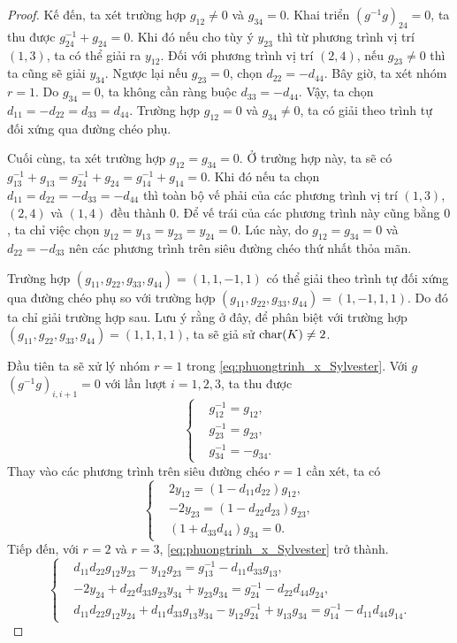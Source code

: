 \begin{proof}
    Kế đến, ta xét trường hợp \( g_{12} \neq 0 \) và \( g_{34} = 0 \). Khai triển \( (g^{-1} g)_{24} = 0 \), ta thu được \( g^{-1}_{24} + g_{24} = 0 \). Khi đó nếu cho tùy ý \( y_{23} \) thì từ phương trình vị trí $(1,3)$, ta có thể giải ra $y_{12}$. Đối với phương trình vị trí $(2,4)$, nếu $g_{23} \neq 0$ thì ta cũng sẽ giải $y_{34}$. Ngược lại nếu $g_{23} = 0$, chọn \( d_{22} = -d_{44} \). Bây giờ, ta xét nhóm \( r = 1 \). Do $g_{34} = 0$, ta không cần ràng buộc \( d_{33} = -d_{44} \). Vậy, ta chọn \( d_{11} = -d_{22} = d_{33} = d_{44} \). Trường hợp \( g_{12} = 0 \) và \( g_{34} \neq 0 \), ta có giải theo trình tự đối xứng qua đường chéo phụ.

    Cuối cùng, ta xét trường hợp \( g_{12} = g_{34} = 0 \). Ở trường hợp này, ta sẽ có \( g^{-1}_{13} + g_{13} = g^{-1}_{24} + g_{24} = g^{-1}_{14} + g_{14} = 0\). Khi đó nếu ta chọn \( d_{11} = d_{22} = -d_{33} = -d_{44} \) thì toàn bộ vế phải của các phương trình vị trí $(1,3)$, $(2,4)$ và $(1,4)$ đều thành $0$. Để vế trái của các phương trình này cũng bằng $0$, ta chỉ việc chọn $y_{12} = y_{13} = y_{23} = y_{24} = 0$. Lúc này, do $g_{12} = g_{34} = 0$ và $d_{22} = -d_{33}$ nên các phương trình trên siêu đường chéo thứ nhất thỏa mãn.

Trường hợp $(g_{11},g_{22},g_{33},g_{44}) = (1, 1, -1, 1)$ có thể giải theo trình tự đối xứng qua đường chéo phụ so với trường hợp $(g_{11},g_{22},g_{33},g_{44}) = (1, -1, 1, 1)$. Do đó ta chỉ giải trường hợp sau. Lưu ý rằng ở đây, để phân biệt với trường hợp $(g_{11},g_{22},g_{33},g_{44}) = (1, 1, 1, 1)$, ta sẽ giả sử $\operatorname{char}(K) \neq 2$.

     Đầu tiên ta sẽ xử lý nhóm \( r = 1\) trong \cref{eq:phuongtrinh_x_Sylvester}. Với $g$ \( (g^{-1}g)_{i,i+1} = 0 \) với lần lượt \( i = 1,2,3 \), ta thu được
    \[
    \left\{ \begin{aligned}
        & g^{-1}_{12} = g_{12}, \\
        & g^{-1}_{23} = g_{23}, \\
        & g^{-1}_{34} = -g_{34}.
    \end{aligned} \right.
    \]
    Thay vào các phương trình trên siêu đường chéo \( r = 1 \) cần xét, ta có
    \[
    \left\{ \begin{aligned}
        & 2 y_{12} =  (1 - d_{11} d_{22}) g_{12}, \\
        & -2 y_{23} =  (1 - d_{22} d_{23}) g_{23}, \\
        & (1 + d_{33} d_{44}) g_{34} = 0.
    \end{aligned} \right.
    \]
    Tiếp đến, với \( r = 2 \) và \( r = 3 \), \cref{eq:phuongtrinh_x_Sylvester} trở thành.
    \[
    \left\{ \begin{aligned}
        & d_{11} d_{22} g_{12} y_{23} - y_{12} g_{23} = g^{-1}_{13} - d_{11} d_{33} g_{13}, \\
        & -2 y_{24} + d_{22} d_{33} g_{23} y_{34} + y_{23} g_{34} = g^{-1}_{24} - d_{22} d_{44} g_{24}, \\
        & d_{11} d_{22} g_{12} y_{24} + d_{11} d_{33} g_{13} y_{34} - y_{12}g^{-1}_{24} + y_{13}g_{34} = g^{-1}_{14} - d_{11} d_{44} g_{14}.
    \end{aligned} \right.
    \]


\end{proof}
